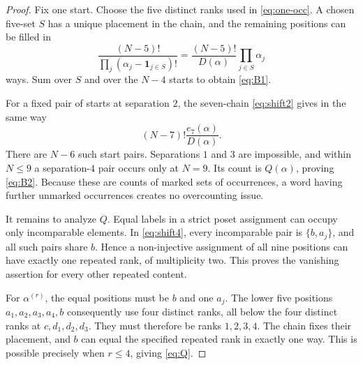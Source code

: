 \documentclass[11pt]{article}
\newcommand{\one}{\mathbf 1}
\begin{document}
\begin{proof}
Fix one start.  Choose the five distinct ranks used in
\eqref{eq:one-occ}.  A chosen five-set $S$ has a unique placement in the
chain, and the remaining positions can be filled in
\[
 \frac{(N-5)!}{\prod_j(\alpha_j-\one_{j\in S})!}
 =\frac{(N-5)!}{D(\alpha)}\prod_{j\in S}\alpha_j
\]
ways.  Sum over $S$ and over the $N-4$ starts to obtain \eqref{eq:B1}.

For a fixed pair of starts at separation $2$, the seven-chain
\eqref{eq:shift2} gives in the same way
\[
 (N-7)!\frac{e_7(\alpha)}{D(\alpha)}.
\]
There are $N-6$ such start pairs.  Separations $1$ and $3$ are impossible,
and within $N\leq9$ a separation-$4$ pair occurs only at $N=9$.  Its count is
$Q(\alpha)$, proving \eqref{eq:B2}.  Because these are counts of marked sets
of occurrences, a word having further unmarked occurrences creates no
overcounting issue.

It remains to analyze $Q$.  Equal labels in a strict poset assignment can
occupy only incomparable elements.  In \eqref{eq:shift4}, every incomparable
pair is $\{b,a_j\}$, and all such pairs share $b$.  Hence a non-injective
assignment of all nine positions can have exactly one repeated rank, of
multiplicity two.  This proves the vanishing assertion for every other
repeated content.

For $\alpha^{(r)}$, the equal positions must be $b$ and one $a_j$.  The lower
five positions $a_1,a_2,a_3,a_4,b$ consequently use four distinct ranks, all
below the four distinct ranks at $c,d_1,d_2,d_3$.  They must therefore be
ranks $1,2,3,4$.  The chain fixes their placement, and $b$ can equal the
specified repeated rank in exactly one way.  This is possible precisely when
$r\leq4$, giving \eqref{eq:Q}.
\end{proof}
\end{document}
